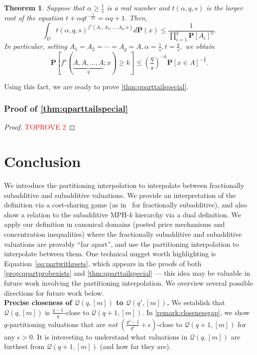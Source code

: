 \documentclass[11pt]{article}%
\newtheorem{theorem}{Theorem}
\numberwithin{theorem}{subsection}
\newcommand{\prob}{\mathbf{P}}
\begin{document}
\begin{theorem}
\label{thm:talagrandgenerals}
\label{thm:specialcaseqpartitioning}
Suppose that $\alpha\ge \frac{1}{s}$ is a real number and $t(\alpha, q,s)$ is the larger root of the equation $t + \alpha q t^{-\frac{1}{\alpha s}} = \alpha q + 1.$ Then, 
$$
\int_{\Omega}
t(\alpha, q, s)^{f^s(A_1, A_2, \ldots, A_q; x)}d\prob(x)\le 
\frac{1}{\prod_{i=1}^q \prob[A_i]^{\alpha}}.
$$
In particular, setting $A_1 = A_2 = \cdots = A_q = A, \alpha = \frac{1}{s}, t = \frac{q}{s},$ we obtain
$$\prob[f^s(\underbrace{A, A, \ldots, A}_{q}; x)\ge k]\le 
\left(\frac{q}{s}\right)^{-k}\prob[x \in A]^{-\frac{q}{s}}.$$
\end{theorem}

\noindent
Using this fact, we are ready to prove \cref{thm:qparttailspecial}.

\subsubsection{Proof of \cref{thm:qparttailspecial}}
\begin{proof}\textcolor{red}{TOPROVE 2}\end{proof}

\section{Conclusion}
\label{section:futurework}
We introduce the partitioning interpolation to interpolate between fractionally subadditive and subadditive valuations. We provide an interpretation of the definition via a cost-sharing game (as in~\cite{Bondareva63,Shapley67} for fractionally subadditive), and also show a relation to the subadditive MPH-$k$ hierarchy via a dual definition. We apply our definition in canonical domains (posted price mechanisms and concentration inequalities) where the fractionally subadditive and subadditive valuations are provably ``far apart'', and use the partitioning interpolation to interpolate between them. One technical nugget worth highlighting is Equation~\eqref{eq:partwithrsets}, which appears in the proofs of both \cref{prop:qpartprobexists} and \cref{thm:qparttailspecial} --- this idea may be valuable in future work involving the partitioning interpolation. We overview several possible directions for future work below.\\

\noindent\textbf{Precise closeness of $\mathcal{Q}(q,[m])$ to $\mathcal{Q}(q',[m])$.} We establish that $\mathcal{Q}(q,[m])$ is $\frac{q-1}{q}$-close to $\mathcal{Q}(q+1,[m])$. In \cref{remark:closenessgap}, we show $q$-partitioning valuations that are \emph{not} $\left(\frac{q^2-1}{q^2}+\epsilon\right)$-close to $\mathcal{Q}(q+1,[m])$ for any $\epsilon>0.$ It is interesting to understand what valuations in $\mathcal{Q}(q,[m])$ are furthest from $\mathcal{Q}(q+1,[m])$ (and how far they are). 
\end{document}
